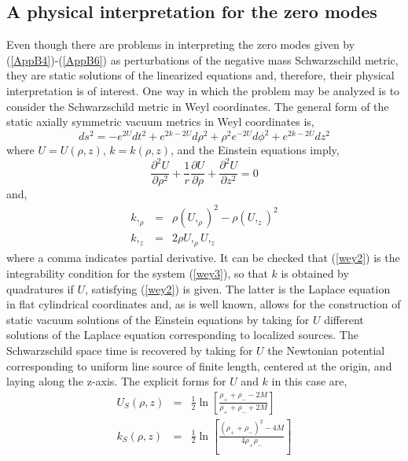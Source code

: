 \documentclass[12pt,aps,floats,showpacs,amssymb,tightenlines]{revtex4}
\begin{document}
\subsection{A physical interpretation for the zero modes}

Even though there are problems in interpreting the zero modes given
by (\ref{AppB4})-(\ref{AppB6}) as
 perturbations of the negative mass Schwarzschild metric, they are static solutions
  of the linearized equations and, therefore, their physical interpretation is of interest.
  One way in which the problem may be analyzed is to consider the Schwarzschild metric in
   Weyl coordinates. The general form of the static axially symmetric vacuum metrics in Weyl
   coordinates is,
\begin{equation}
\label{wey1} ds^2=-e^{2U} dt^2+ e^{2k-2U} d\rho^2+\rho^2 e^{-2U}
d\phi^2 +e^{2k-2U} dz^2
\end{equation}
where $U=U(\rho,z)$, $k=k(\rho,z)$, and the Einstein equations
imply,
\begin{equation}
\label{wey2} \frac{\partial^2 U}{\partial \rho^2} +\frac{1}{r}
\frac{\partial U}{\partial \rho}+\frac{\partial^2 U}{\partial z^2}=0
\end{equation}
and,
\begin{eqnarray}
\label{wey3}
 k,_{\rho} & = & \rho \left(U,_{\rho}\right)^2-  \rho \left(U,_{z}\right)^2 \nonumber \\
k,_{z} & = & 2 \rho  U,_{\rho}U,_{z}
\end{eqnarray}
where a comma indicates partial derivative. It can be checked that
(\ref{wey2}) is the integrability condition for the system
(\ref{wey3}), so that $k$ is obtained by quadratures if $U$,
satisfying (\ref{wey2}) is given. The latter is the Laplace equation
in flat cylindrical coordinates and, as is well known, allows for
the construction of static vacuum solutions of the Einstein
equations by taking for $U$ different
 solutions of the Laplace equation corresponding to localized sources. The Schwarzschild space
 time is recovered by taking for $U$ the Newtonian potential corresponding to uniform line
  source of finite length, centered at the origin, and laying along the z-axis. The explicit
   forms for $U$ and $k$ in this case are,
\begin{eqnarray}
\label{wey4}
U_S(\rho,z) & = & \frac{1}{2} \ln\left[\frac{\rho_+ +\rho_- -2M}{\rho_+ +\rho_- +2M}\right] \nonumber \\
k_S(\rho,z)& = &  \frac{1}{2} \ln\left[\frac{(\rho_+ +\rho_-)^2-4M}{
4 \rho_+ \rho_-}\right]
\end{eqnarray}
\end{document}
